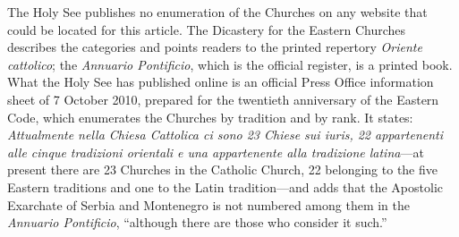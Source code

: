 The Holy See publishes no enumeration of the Churches  on any website that could be located for this article. The Dicastery for the Eastern Churches describes the categories and points readers to the printed repertory \emph{Oriente cattolico}; the \emph{Annuario Pontificio}, which is the official register, is a printed book. What the Holy See has published online is an official Press Office information sheet of 7 October 2010, prepared for the twentieth anniversary of the Eastern Code, which enumerates the Churches by tradition and by rank. It states: \emph{Attualmente nella Chiesa Cattolica ci sono 23 Chiese sui iuris, 22 appartenenti alle cinque tradizioni orientali e una appartenente alla tradizione latina}---at present there are 23 Churches  in the Catholic Church, 22 belonging to the five Eastern traditions and one to the Latin tradition---and adds that the Apostolic Exarchate of Serbia and Montenegro is not numbered among them in the \emph{Annuario Pontificio}, ``although there are those who consider it such.''

